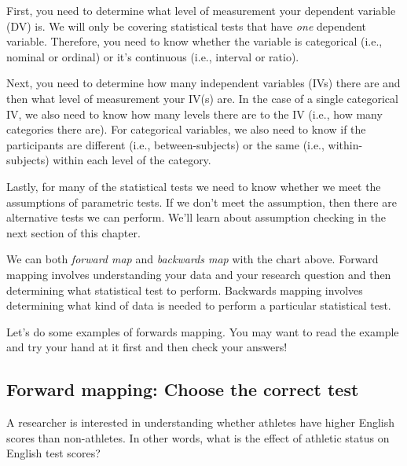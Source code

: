 \documentclass[
]{book}
\begin{document}
First, you need to determine what level of measurement your dependent variable (DV) is. We will only be covering statistical tests that have \emph{one} dependent variable. Therefore, you need to know whether the variable is categorical (i.e., nominal or ordinal) or it's continuous (i.e., interval or ratio).

Next, you need to determine how many independent variables (IVs) there are and then what level of measurement your IV(s) are. In the case of a single categorical IV, we also need to know how many levels there are to the IV (i.e., how many categories there are). For categorical variables, we also need to know if the participants are different (i.e., between-subjects) or the same (i.e., within-subjects) within each level of the category.

Lastly, for many of the statistical tests we need to know whether we meet the assumptions of parametric tests. If we don't meet the assumption, then there are alternative tests we can perform. We'll learn about assumption checking in the next section of this chapter.

We can both \emph{forward map} and \emph{backwards map} with the chart above. Forward mapping involves understanding your data and your research question and then determining what statistical test to perform. Backwards mapping involves determining what kind of data is needed to perform a particular statistical test.

Let's do some examples of forwards mapping. You may want to read the example and try your hand at it first and then check your answers!

\hypertarget{forward-mapping-choose-the-correct-test}{%
\subsection{Forward mapping: Choose the correct test}\label{forward-mapping-choose-the-correct-test}}

A researcher is interested in understanding whether athletes have higher English scores than non-athletes. In other words, what is the effect of athletic status on English test scores?
\end{document}
